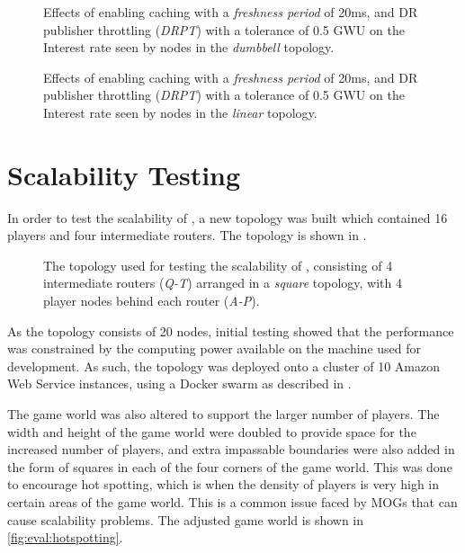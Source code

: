 \begin{figure}[H]
    \centering
    \caption{Effects of enabling caching with a \textit{freshness period} of 20ms, and DR publisher throttling (\textit{DRPT}) with a tolerance of 0.5 GWU on the Interest rate seen by nodes in the \textit{dumbbell} topology.}
    \label{fig:eval:dr-pub-throt:dumbbell-interest-rates}
\end{figure}
 

\begin{figure}[H]
    \centering
    \caption{Effects of enabling caching with a \textit{freshness period} of 20ms, and DR publisher throttling (\textit{DRPT}) with a tolerance of 0.5 GWU on the Interest rate seen by nodes in the \textit{linear} topology.}
    \label{fig:eval:dr-pub-throt:linear-interest-rates}
\end{figure}



\section{Scalability Testing}\label{sec:eval:scalability}
In order to test the scalability of \game{}, a new topology was built which contained 16 players and four intermediate routers. The topology is shown in .

\begin{figure}[H]
    \centering
    \caption{The topology used for testing the scalability of \game{}, consisting of 4 intermediate routers (\textit{Q-T}) arranged in a \textit{square} topology, with 4 player nodes behind each router (\textit{A-P}).}
    \label{fig:eval:scalability-topology}
\end{figure}

As the topology consists of 20 nodes, initial testing showed that the performance was constrained by the computing power available on the machine used for development. As such, the topology was deployed onto a cluster of 10 Amazon Web Service instances, using a Docker swarm as described in .

The game world was also altered to support the larger number of players. The width and height of the game world were doubled to provide space for the increased number of players, and extra impassable boundaries were also added in the form of squares in each of the four corners of the game world. This was done to encourage hot spotting, which is when the density of players is very high in certain areas of the game world. This is a common issue faced by MOGs that can cause scalability problems. The adjusted game world is shown in \ref{fig:eval:hotspotting}.

